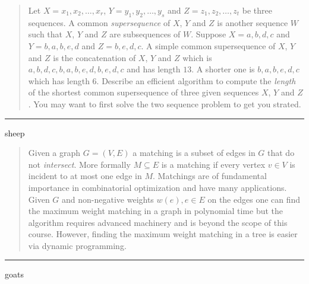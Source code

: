 \documentclass[11pt]{article}
\begin{document}
\begin{quote}
Let $X = x_1,x_2,\ldots,x_r$, $Y = y_1,y_2,\ldots,y_s$ and $Z =
  z_1,z_2,\ldots,z_t$ be three sequences. A common {\em supersequence}
  of $X$, $Y$ and $Z$ is another sequence $W$ such that $X$, $Y$ and $Z$
  are subsequences of $W$. Suppose $X = a,b,d,c$ and $Y = b,a,b,e,d$ and $Z =
  b, e, d, c$. A simple common supersequence of $X$, $Y$ and $Z$ is
  the concatenation of $X$, $Y$ and $Z$ which is
  $a,b,d,c,b,a,b,e,d,b,e,d,c$ and has length $13$. A shorter one is
  $b, a, b, e, d, c$ which has length $6$.  Describe an efficient
  algorithm to compute the {\em length} of the shortest common
  supersequence of three given sequences $X$, $Y$ and $Z$. You may want to
  first solve the two sequence problem to get you strated.
\end{quote}
\hrule



\begin{solution}
    sheep
\end{solution}


\begin{quote}
Given a graph $G=(V,E)$ a matching is a subset of edges in $G$
  that do not \emph{intersect}. More formally $M \subseteq E$ is a
  matching if every vertex $v \in V$ is incident to at most one edge
  in $M$. Matchings are of fundamental importance in combinatorial
  optimization and have many applications. Given $G$ and non-negative
  weights $w(e), e \in E$ on the edges one can find the maximum weight
  matching in a graph in polynomial time but the algorithm requires
  advanced machinery and is beyond the scope of this course. However,
  finding the maximum weight matching in a tree is easier via dynamic
  programming. 
\end{quote}
\hrule



\begin{solution}
    goats
\end{solution}
\end{document}
